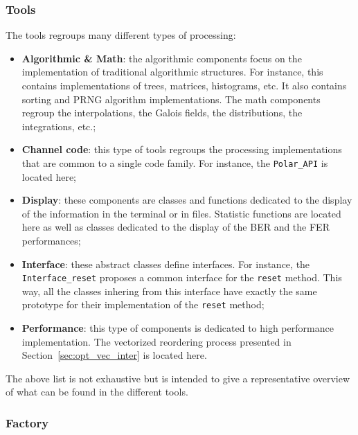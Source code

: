 \subsubsection{Tools}

The tools regroups many different types of processing:
\begin{itemize}
  \item \textbf{Algorithmic \& Math}: the algorithmic components focus on the
    implementation of traditional algorithmic structures. For instance, this
    contains implementations of trees, matrices, histograms, etc. It also
    contains sorting and PRNG algorithm implementations. The math components
    regroup the interpolations, the Galois fields, the distributions, the
    integrations, etc.;
  \item \textbf{Channel code}: this type of tools regroups the processing
    implementations that are common to a single code family. For instance, the
    \verb|Polar_API| is located here;
  \item \textbf{Display}: these components are classes and functions dedicated
    to the display of the information in the terminal or in files. Statistic
    functions are located here as well as classes dedicated to the display of
    the BER and the FER performances;
  \item \textbf{Interface}: these abstract classes define interfaces. For
    instance, the \verb|Interface_reset| proposes a common interface for the
    \verb|reset| method. This way, all the classes inhering from this interface
    have exactly the same prototype for their implementation of the \verb|reset|
    method;
  \item \textbf{Performance}: this type of components is dedicated to high
    performance implementation. The vectorized reordering process presented in
    Section~\ref{sec:opt_vec_inter} is located here.
\end{itemize}
The above list is not exhaustive but is intended to give a representative
overview of what can be found in the different tools.

\subsubsection{Factory}

